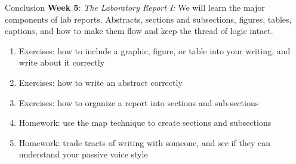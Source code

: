 \documentclass{beamer}
\begin{document}
\begin{frame}{Conclusion}
\small
\textbf{Week 5}: \textit{The Laboratory Report I:} We will learn the major components of lab reports.  Abstracts, sections and subsections, figures, tables, captions, and how to make them flow and keep the thread of logic intact.
\begin{enumerate}
\item Exercises: how to include a graphic, figure, or table into your writing, and write about it correctly
\item Exercises: how to write an abstract correctly
\item Exercises: how to organize a report into sections and sub-sections
\item Homework: use the map technique to create sections and subsections
\item Homework: trade tracts of writing with someone, and see if they can understand your passive voice style
\end{enumerate}
\end{frame}
\end{document}
